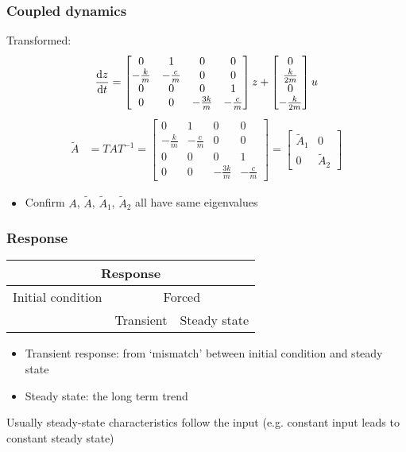 \documentclass{beamer-control}
\begin{document}
\begin{frame}
\frametitle{Coupled dynamics}
Transformed:
\[
\frac{\mathrm{d} z}{\mathrm{d} t} =
\begin{bmatrix}
0 & 1 & 0 & 0 \\
-\frac{k}{m} & -\frac{c}{m} & 0 & 0 \\
0 & 0 & 0 & 1 \\
0 & 0 & -\frac{3k}{m} & -\frac{c}{m}
\end{bmatrix}
z +
\begin{bmatrix}
0 \\
\frac{k}{2m} \\
0 \\
-\frac{k}{2m}
\end{bmatrix}
u
\]
\begin{align}
\tilde A &= TAT^{-1} = 
\begin{bmatrix}
0 & 1 & 0 & 0 \\
-\frac{k}{m} & -\frac{c}{m} & 0 & 0 \\
0 & 0 & 0 & 1 \\
0 & 0 & -\frac{3k}{m} & -\frac{c}{m}
\end{bmatrix}
=
\begin{bmatrix}
\tilde A_1 & 0 \\
0 & \tilde A_2
\end{bmatrix}
\end{align}
\begin{itemize}
\item Confirm $A$, $\tilde A$, $\tilde A_1$, $\tilde A_2$ all have same eigenvalues
\end{itemize}

\end{frame}


\begin{frame}
\frametitle{Response}

\begin{tabular}{|p{2cm}|p{2cm}|p{2cm}|p{2cm}|}
\hline
\multicolumn{4}{|c|}{Response}\\
\hline
\multicolumn{2}{|c|}{Initial condition} & \multicolumn{2}{c|}{Forced}\\
\hline
 &  & Transient & Steady state\\
\hline
\end{tabular}
\bigskip

\begin{itemize}
\item
Transient response: from `mismatch' between initial condition and steady state
\item
Steady state: the long term trend
\end{itemize}
\bigskip

Usually steady-state characteristics follow the input (e.g. constant input leads to constant steady state)

\end{frame}
\end{document}
